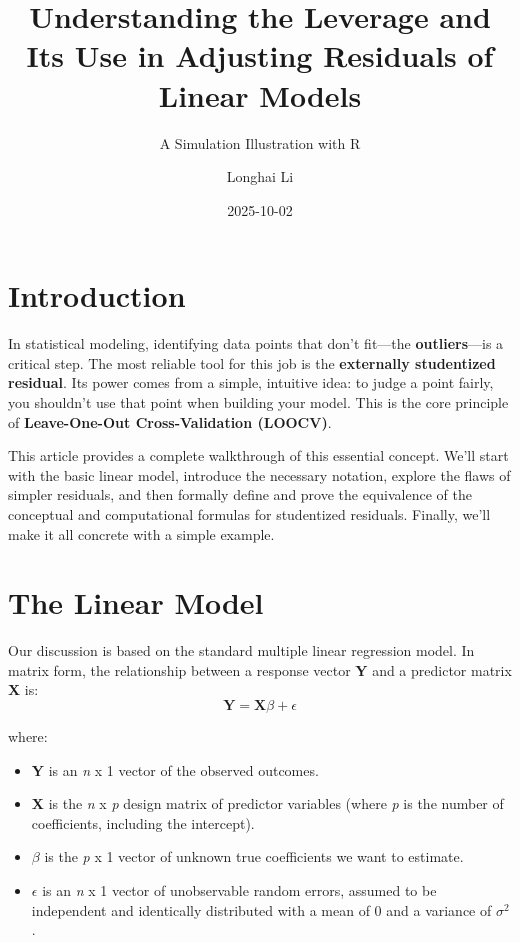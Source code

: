 \documentclass[
]{article}
\title{Understanding the Leverage and Its Use in Adjusting Residuals of
Linear Models}
\subtitle{A Simulation Illustration with R}
\author{Longhai Li}
\date{2025-10-02}
\providecommand{\tightlist}{%
  \setlength{\itemsep}{0pt}\setlength{\parskip}{0pt}}
\begin{document}
\maketitle

\section{Introduction}\label{introduction}

In statistical modeling, identifying data points that don't fit---the
\textbf{outliers}---is a critical step. The most reliable tool for this
job is the \textbf{externally studentized residual}. Its power comes
from a simple, intuitive idea: to judge a point fairly, you shouldn't
use that point when building your model. This is the core principle of
\textbf{Leave-One-Out Cross-Validation (LOOCV)}.

This article provides a complete walkthrough of this essential concept.
We'll start with the basic linear model, introduce the necessary
notation, explore the flaws of simpler residuals, and then formally
define and prove the equivalence of the conceptual and computational
formulas for studentized residuals. Finally, we'll make it all concrete
with a simple example.

\section{The Linear Model}\label{the-linear-model}

Our discussion is based on the standard multiple linear regression
model. In matrix form, the relationship between a response vector
\textbf{Y} and a predictor matrix \textbf{X} is: \[
\mathbf{Y} = \mathbf{X}\beta + \epsilon
\]

where:

\begin{itemize}
\tightlist
\item
  \textbf{Y} is an \emph{n} x 1 vector of the observed outcomes.
\item
  \textbf{X} is the \emph{n} x \emph{p} design matrix of predictor
  variables (where \emph{p} is the number of coefficients, including the
  intercept).
\item
  \(\beta\) is the \emph{p} x 1 vector of unknown true coefficients we
  want to estimate.
\item
  \(\epsilon\) is an \emph{n} x 1 vector of unobservable random errors,
  assumed to be independent and identically distributed with a mean of 0
  and a variance of \(\sigma^2\).
\end{itemize}
\end{document}
